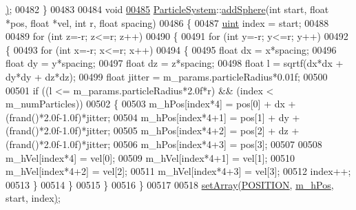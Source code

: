 \begin{DoxyCode}
{{{{{      \hyperlink{class_particle_system_aa792a66680e800832059854aab0d594d}{)};
00482 \}
00483 
00484 \textcolor{keywordtype}{void}
\hypertarget{particle_system_8cpp_source_l00485}{}\hyperlink{class_particle_system_af2f16676fe8a0523cfb867a9a856970c}{00485} \hyperlink{class_particle_system}{ParticleSystem}::\hyperlink{class_particle_system_af2f16676fe8a0523cfb867a9a856970c}{addSphere}(\textcolor{keywordtype}{int} start, \textcolor{keywordtype}{float} *pos, \textcolor{keywordtype}{float} *vel, \textcolor{keywordtype}{int} r, \textcolor{keywordtype}{float} 
      spacing)
00486 \{
00487     \hyperlink{particles__kernel_8cuh_a91ad9478d81a7aaf2593e8d9c3d06a14}{uint} index = start;
00488 
00489     \textcolor{keywordflow}{for} (\textcolor{keywordtype}{int} z=-r; z<=r; z++)
00490     \{
00491         \textcolor{keywordflow}{for} (\textcolor{keywordtype}{int} y=-r; y<=r; y++)
00492         \{
00493             \textcolor{keywordflow}{for} (\textcolor{keywordtype}{int} x=-r; x<=r; x++)
00494             \{
00495                 \textcolor{keywordtype}{float} dx = x*spacing;
00496                 \textcolor{keywordtype}{float} dy = y*spacing;
00497                 \textcolor{keywordtype}{float} dz = z*spacing;
00498                 \textcolor{keywordtype}{float} l = sqrtf(dx*dx + dy*dy + dz*dz);
00499                 \textcolor{keywordtype}{float} jitter = m\_params.particleRadius*0.01f;
00500 
00501                 \textcolor{keywordflow}{if} ((l <= m\_params.particleRadius*2.0f*r) && (index < m\_numParticles))
00502                 \{
00503                     m\_hPos[index*4]   = pos[0] + dx + (frand()*2.0f-1.0f)*jitter;
00504                     m\_hPos[index*4+1] = pos[1] + dy + (frand()*2.0f-1.0f)*jitter;
00505                     m\_hPos[index*4+2] = pos[2] + dz + (frand()*2.0f-1.0f)*jitter;
00506                     m\_hPos[index*4+3] = pos[3];
00507 
00508                     m\_hVel[index*4]   = vel[0];
00509                     m\_hVel[index*4+1] = vel[1];
00510                     m\_hVel[index*4+2] = vel[2];
00511                     m\_hVel[index*4+3] = vel[3];
00512                     index++;
00513                 \}
00514             \}
00515         \}
00516     \}
00517 
00518     \hyperlink{class_particle_system_aa792a66680e800832059854aab0d594d}{setArray}\hyperlink{class_particle_system_aa792a66680e800832059854aab0d594d}{(}\hyperlink{class_particle_system_a332fbe57a36aaea5c18b4ea4fba6bbb3a9e9a2992d230a2674debf26e0e8e0299}{POSITION}\hyperlink{class_particle_system_aa792a66680e800832059854aab0d594d}{,} \hyperlink{class_particle_system_ab9d75471d2eaaeb8fa98d2f3f47d9c25}{m\_hPos}\hyperlink{class_particle_system_aa792a66680e800832059854aab0d594d}{,} start\hyperlink{class_particle_system_aa792a66680e800832059854aab0d594d}{,} index\hyperlink{class_particle_system_aa792a66680e800832059854aab0d594d}{)};
}}}}}
\end{DoxyCode}
